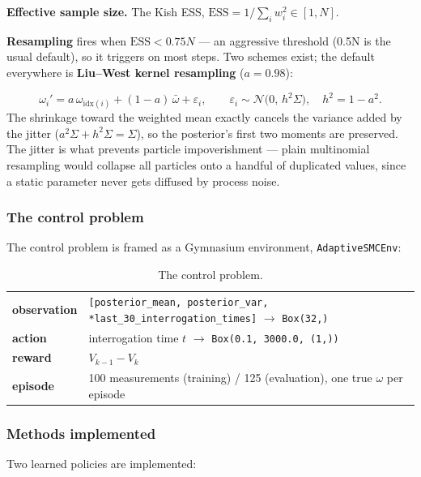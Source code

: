 \documentclass[12pt,a4paper]{article}
\begin{document}
\textbf{Effective sample size.} The Kish ESS, $\mathrm{ESS} = 1/\sum_i w_i^2 \in [1, N]$.

\textbf{Resampling} fires when $\mathrm{ESS} < 0.75N$ --- an aggressive threshold (0.5N is the usual default), so it triggers on most steps. Two schemes exist; the default everywhere is \textbf{Liu--West kernel resampling} ($a = 0.98$):

\begin{equation}
\omega_i' = a\,\omega_{\mathrm{idx}(i)} + (1-a)\,\bar{\omega} + \varepsilon_i,
\qquad \varepsilon_i \sim \mathcal{N}\bigl(0,\, h^{2}\Sigma\bigr), \quad h^{2} = 1 - a^{2}.
\label{eq:liu-west}
\end{equation}
The shrinkage toward the weighted mean exactly cancels the variance added by the jitter ($a^2\Sigma + h^2\Sigma = \Sigma$), so the posterior's first two moments are preserved. The jitter is what prevents particle impoverishment --- plain multinomial resampling would collapse all particles onto a handful of duplicated values, since a static parameter never gets diffused by process noise.

\subsubsection{The control problem}\label{sec:the-control-problem}
The control problem is framed as a Gymnasium environment, \texttt{AdaptiveSMCEnv}:

\begin{table}[H]
  \centering
  \caption{The control problem.}
  \label{tab:the-control-problem}
  \scriptsize
  \begin{tabular}{ll}
  \toprule
  \textbf{observation} & \texttt{[posterior\_\allowbreak{}mean, posterior\_\allowbreak{}var, *last\_\allowbreak{}30\_\allowbreak{}interrogation\_\allowbreak{}times]} $\rightarrow$ \texttt{Box(32,)} \\
  \textbf{action} & interrogation time $t$ $\rightarrow$ \texttt{Box(0.\allowbreak{}1, 3000.\allowbreak{}0, (1,))} \\
  \textbf{reward} & $V_{k-1} - V_k$ \\
  \textbf{episode} & 100 measurements (training) / 125 (evaluation), one true $\omega$ per episode \\
  \bottomrule
  \end{tabular}
\end{table}

\subsubsection{Methods implemented}\label{sec:methods-implemented}
Two learned policies are implemented:
\end{document}
